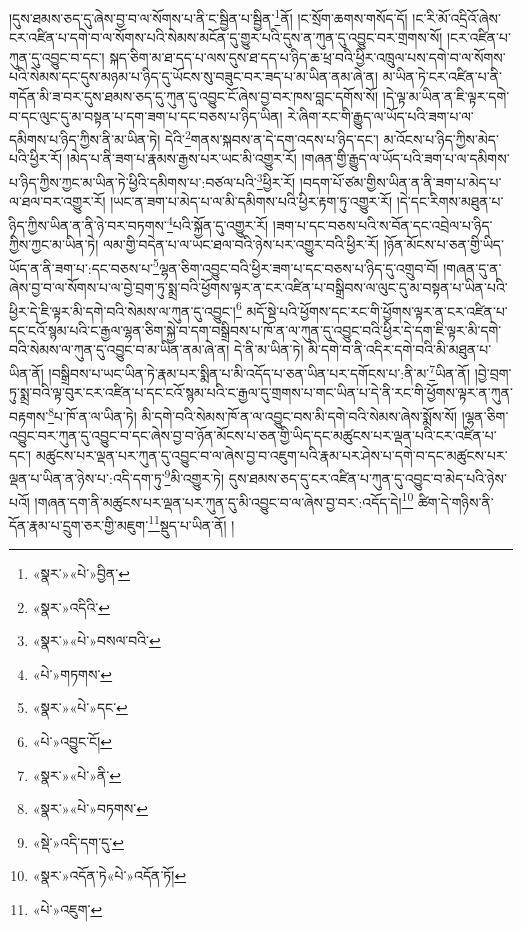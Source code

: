 །དུས་ཐམས་ཅད་དུ་ཞེས་བྱ་བ་ལ་སོགས་པ་ནི་ང་སྦྱིན་པ་སྦྱིན་\footnote{«སྣར་»«པེ་»བྱིན་}ནོ། །ང་སྲོག་ཆགས་གསོད་དོ། །ང་རི་མོ་འདྲིའོ་ཞེས་ངར་འཛིན་པ་དགེ་བ་ལ་སོགས་པའི་སེམས་མངོན་དུ་གྱུར་པའི་དུས་ན་ཀུན་དུ་འབྱུང་བར་གྲགས་སོ། །ངར་འཛིན་པ་ཀུན་དུ་འབྱུང་བ་དང་། སྐད་ཅིག་མ་ཐ་དད་པ་ལས་དུས་ཐ་དད་པ་ཉིད་ཆ་ཕྲ་བའི་ཕྱིར་འཁྲུལ་པས་དགེ་བ་ལ་སོགས་པའི་སེམས་དང་དུས་མཉམ་པ་ཉིད་དུ་ཡོངས་སུ་བཟུང་བར་ཟད་པ་མ་ཡིན་ནམ་ཞེ་ན། མ་ཡིན་ཏེ་ངར་འཛིན་པ་ནི་གདོན་མི་ཟ་བར་དུས་ཐམས་ཅད་དུ་ཀུན་དུ་འབྱུང་ངོ་ཞེས་བྱ་བར་ཁས་བླང་དགོས་སོ། །དེ་ལྟ་མ་ཡིན་ན་ཇི་ལྟར་དགེ་བ་དང་ལུང་དུ་མ་བསྟན་པ་དག་ཟག་པ་དང་བཅས་པ་ཉིད་ཡིན། རེ་ཞིག་རང་གི་རྒྱུད་ལ་ཡོད་པའི་ཟག་པ་ལ་དམིགས་པ་ཉིད་ཀྱིས་ནི་མ་ཡིན་ཏེ། དེའི་\footnote{«སྣར་»འདིའི་}གནས་སྐབས་ན་དེ་དག་འདས་པ་ཉིད་དང་། མ་འོངས་པ་ཉིད་ཀྱིས་མེད་པའི་ཕྱིར་རོ། །མེད་པ་ནི་ཟག་པ་རྣམས་རྒྱས་པར་ཡང་མི་འགྱུར་རོ། །གཞན་གྱི་རྒྱུད་ལ་ཡོད་པའི་ཟག་པ་ལ་དམིགས་པ་ཉིད་ཀྱིས་ཀྱང་མ་ཡིན་ཏེ་ཕྱིའི་དམིགས་པ་:བཙལ་པའི་\footnote{«སྣར་»«པེ་»བསལ་བའི་}ཕྱིར་རོ། །བདག་པོ་ཙམ་གྱིས་ཡིན་ན་ནི་ཟག་པ་མེད་པ་ལ་ཐལ་བར་འགྱུར་རོ། །ཡང་ན་ཟག་པ་མེད་པ་ལ་མི་དམིགས་པའི་ཕྱིར་རྟག་ཏུ་འགྱུར་རོ། །དེ་དང་རིགས་མཐུན་པ་ཉིད་ཀྱིས་ཡིན་ན་ནི་ཉེ་བར་བཏགས་\footnote{«པེ་»གཏགས་}པའི་སྐྱོན་དུ་འགྱུར་རོ། །ཟག་པ་དང་བཅས་པའི་ས་བོན་དང་འབྲེལ་པ་ཉིད་ཀྱིས་ཀྱང་མ་ཡིན་ཏེ། ལམ་གྱི་བདེན་པ་ལ་ཡང་ཐལ་བའི་ཉེས་པར་འགྱུར་བའི་ཕྱིར་རོ། །ཉོན་མོངས་པ་ཅན་གྱི་ཡིད་ཡོད་ན་ནི་ཟག་པ་:དང་བཅས་པ་\footnote{«སྣར་»«པེ་»དང་}ལྷན་ཅིག་འབྱུང་བའི་ཕྱིར་ཟག་པ་དང་བཅས་པ་ཉིད་དུ་འགྲུབ་བོ། །གཞན་དུ་ན་ཞེས་བྱ་བ་ལ་སོགས་པ་ལ་བྱེ་བྲག་ཏུ་སྨྲ་བའི་ཕྱོགས་ལྟར་ན་ངར་འཛིན་པ་བསྒྲིབས་ལ་ལུང་དུ་མ་བསྟན་པ་ཡིན་པའི་ཕྱིར་དེ་ཇི་ལྟར་མི་དགེ་བའི་སེམས་ལ་ཀུན་དུ་འབྱུང་།\footnote{«པེ་»འབྱུང་ངོ།} མདོ་སྡེ་པའི་ཕྱོགས་དང་རང་གི་ཕྱོགས་ལྟར་ན་ངར་འཛིན་པ་དང་ངའོ་སྙམ་པའི་ང་རྒྱལ་ལྷན་ཅིག་སྐྱེ་བ་དག་བསྒྲིབས་པ་ཁོ་ན་ལ་ཀུན་དུ་འབྱུང་བའི་ཕྱིར་དེ་དག་ཇི་ལྟར་མི་དགེ་བའི་སེམས་ལ་ཀུན་དུ་འབྱུང་བ་མ་ཡིན་ནམ་ཞེ་ན། དེ་ནི་མ་ཡིན་ཏེ། མི་དགེ་བ་ནི་འདིར་དགེ་བའི་མི་མཐུན་པ་ཡིན་ནོ། །བསྒྲིབས་པ་ཡང་ཡིན་ཏེ་རྣམ་པར་སྨིན་པ་མི་འདོད་པ་ཅན་ཡིན་པར་དགོངས་པ་:ནི་མ་\footnote{«སྣར་»«པེ་»ནི་}ཡིན་ནོ། །བྱེ་བྲག་ཏུ་སྨྲ་བའི་ལྟ་བུར་ངར་འཛིན་པ་དང་ངའོ་སྙམ་པའི་ང་རྒྱལ་དུ་གྲགས་པ་གང་ཡིན་པ་དེ་ནི་རང་གི་ཕྱོགས་ལྟར་ན་ཀུན་བརྟགས་\footnote{«སྣར་»«པེ་»བཏགས་}པ་ཁོ་ན་ལ་ཡིན་ཏེ། མི་དགེ་བའི་སེམས་ཁོ་ན་ལ་འབྱུང་བས་མི་དགེ་བའི་སེམས་ཞེས་སྨོས་སོ། །ལྷན་ཅིག་འབྱུང་བར་ཀུན་དུ་འབྱུང་བ་དང་ཞེས་བྱ་བ་ཉོན་མོངས་པ་ཅན་གྱི་ཡིད་དང་མཚུངས་པར་ལྡན་པའི་ངར་འཛིན་པ་དང་། མཚུངས་པར་ལྡན་པར་ཀུན་དུ་འབྱུང་བ་ལ་ཞེས་བྱ་བ་འཇུག་པའི་རྣམ་པར་ཤེས་པ་དགེ་བ་དང་མཚུངས་པར་ལྡན་པ་ཡིན་ན་ཉེས་པ་:འདི་དག་ཏུ་\footnote{«སྡེ་»འདི་དག་དུ་}མི་འགྱུར་ཏེ། དུས་ཐམས་ཅད་དུ་ངར་འཛིན་པ་ཀུན་དུ་འབྱུང་བ་མེད་པའི་ཉེས་པའོ། །གཞན་དག་ནི་མཚུངས་པར་ལྡན་པར་ཀུན་དུ་མི་འབྱུང་བ་ལ་ཞེས་བྱ་བར་:འདོད་དེ།\footnote{«སྣར་»འདོན་ཏེ«པེ་»འདོན་ཏོ།} ཚིག་དེ་གཉིས་ནི་དོན་རྣམ་པ་དྲུག་ཅར་གྱི་མཇུག་\footnote{«པེ་»འཇུག་}སྡུད་པ་ཡིན་ནོ། །
